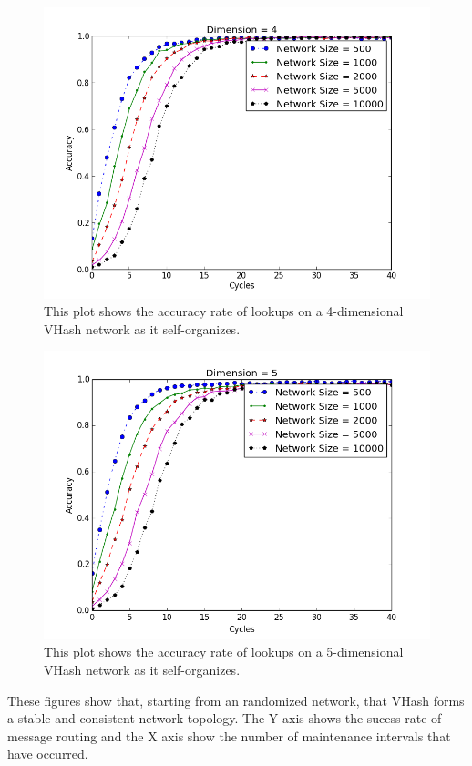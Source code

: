\documentclass[10pt, conference, letterpaper]{IEEEtran}
\begin{document}
{\begin{figure}
	\centering
	\includegraphics[width=\linewidth]{conv_d4}
	\caption{}
		\caption{This plot shows the accuracy rate of lookups on a 4-dimensional VHash network as it self-organizes.}
\end{figure}


\begin{figure}
	\centering
	\includegraphics[width=\linewidth]{conv_d5}
		\caption{This plot shows the accuracy rate of lookups on a 5-dimensional VHash network as it self-organizes.}
	\label{conv5}
\end{figure}

These figures show that, starting from an randomized network, that VHash forms a stable and consistent network topology.
The Y axis shows the sucess rate of message routing and the X axis show the number of maintenance intervals that have occurred.

}
\end{document}
